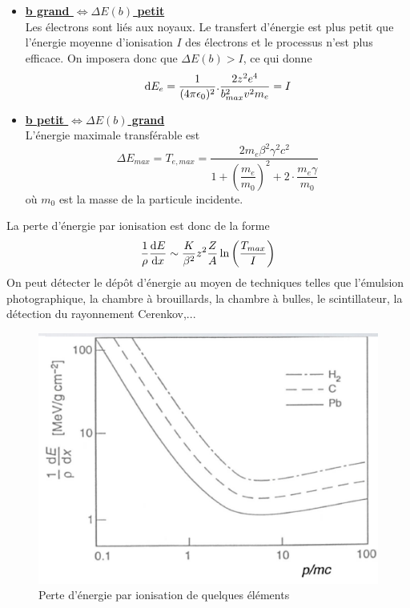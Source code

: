 \begin{itemize}[label=$\rightarrow$]
    \item \underline{\textbf{b grand $\Leftrightarrow\Delta E(b)$ petit}}\\[0,2cm]
    Les électrons sont liés aux noyaux. Le transfert d'énergie est plus petit que l'énergie moyenne d'ionisation $I$ des électrons et le processus n'est plus efficace. On imposera donc que $\Delta E(b) > I$, ce qui donne 
    \[
        \mathrm{d} E_e=\dfrac{1}{(4\pi \epsilon_0)^2}.\dfrac{2z^2e^4}{b_{max}^2v^2m_e}=I
    \]
    \item \underline{\textbf{b petit $\Longleftrightarrow\Delta E(b)$ grand}}\\[0,2cm]
    L'énergie maximale transférable est 
        \[
            \Delta E_{max}=T_{e,max}=\dfrac{2m_e\beta^2\gamma^2c^2}{1+\left(\dfrac{m_e}{m_0}\right)^2+2\cdot\dfrac{m_e\gamma}{m_0}}
        \]
    où $m_0$ est la masse de la particule incidente.
\end{itemize}
La perte d'énergie par ionisation est donc de la forme 
\[
    \dfrac{1}{\rho}\dv{E}{x} \sim \dfrac{K}{\beta^2}z^2\dfrac{Z}{A}  \ln{\left(\dfrac{T_{max}}{I}\right)}
\]
On peut détecter le dépôt d'énergie au moyen de techniques telles que l'émulsion photographique, la chambre à brouillards, la chambre à bulles, le scintillateur, la détection du rayonnement Cerenkov,...
    
    \begin{figure}[ht]
        \centering
        \includegraphics[scale=0.60]{Images1/perteenergie.PNG}
        \caption{Perte d'énergie par ionisation de quelques éléments}
    \end{figure}
    
